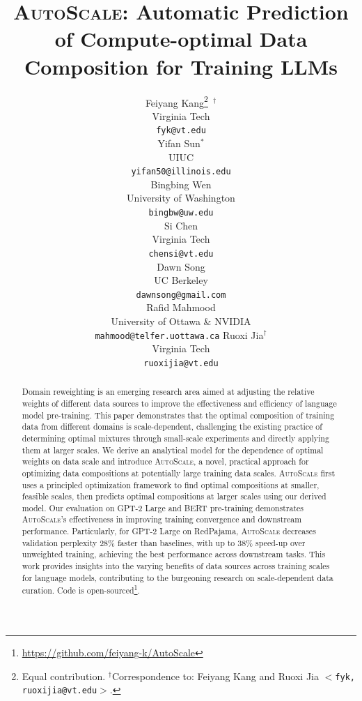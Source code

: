 \documentclass{article} %
\title{\textsc{AutoScale}: Automatic Prediction of Compute-optimal Data Composition for Training LLMs}
\author{%
  Feiyang Kang\thanks{Equal contribution. $^\dagger$Correspondence to: Feiyang Kang and Ruoxi Jia \texttt{$<$fyk, ruoxijia@vt.edu$>$}.  } $\,^{\dagger}$ \\
  Virginia Tech\\
  \small{\texttt{fyk@vt.edu}}\normalsize \\
  \And
  Yifan Sun$^{*}$\\
  UIUC\\
  \small{\texttt{yifan50@illinois.edu}}\normalsize \\
  \And
  Bingbing Wen\\
  University of Washington\\
  \small{\texttt{bingbw@uw.edu}}\normalsize \\
  \And
  Si Chen\\
  Virginia Tech\\
  \small{\texttt{chensi@vt.edu}}\normalsize \\
  \AND
  Dawn Song\\
  UC Berkeley\\
  \small{\texttt{dawnsong@gmail.com}}\normalsize \\
  \And
  Rafid Mahmood\\
  University of Ottawa \& NVIDIA\\
\small{\texttt{mahmood@telfer.uottawa.ca}}\normalsize
  \And
  Ruoxi Jia$^{\dagger}$\\
  Virginia Tech\\
  \small{\texttt{ruoxijia@vt.edu}}\normalsize \\
}
\begin{document}
\maketitle

\begin{abstract}
Domain reweighting is an emerging research area aimed at adjusting the relative weights of different data sources to improve the effectiveness and efficiency of language model pre-training. This paper demonstrates that the optimal composition of training data from different domains is scale-dependent, challenging the existing practice of determining optimal mixtures through small-scale experiments and directly applying them at larger scales. We derive an analytical model for the dependence of optimal weights on data scale and introduce \textsc{AutoScale}, a novel, practical approach for optimizing data compositions at potentially large training data scales. \textsc{AutoScale} first uses a principled optimization framework to find optimal compositions at smaller, feasible scales, then predicts optimal compositions at larger scales using our derived model. Our evaluation on GPT-2 Large and BERT pre-training demonstrates \textsc{AutoScale}'s effectiveness in improving training convergence and downstream performance. Particularly, for GPT-2 Large on RedPajama, \textsc{AutoScale} decreases validation perplexity 28\% faster than baselines, with up to 38\% speed-up over unweighted training, achieving the best performance across downstream tasks. This work provides insights into the varying benefits of data sources across training scales for language models, contributing to the burgeoning research on scale-dependent data curation. Code is open-sourced\footnote{\small{\url{https://github.com/feiyang-k/AutoScale}}}.

\end{abstract}
\end{document}
